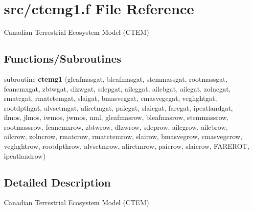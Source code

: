\hypertarget{ctemg1_8f}{}\section{src/ctemg1.f File Reference}
\label{ctemg1_8f}


Canadian Terrestrial Ecosystem Model (C\+T\+E\+M)  


\subsection*{Functions/\+Subroutines}
\begin{DoxyCompactItemize}
\item 
\hypertarget{ctemg1_8f_ad173c7eefb7f79fe8473bb162aa2f2e3}{}subroutine {\bfseries ctemg1} (gleafmasgat, bleafmasgat, stemmassgat, rootmassgat, fcancmxgat, zbtwgat, dlzwgat, sdepgat, ailcggat, ailcbgat, ailcgat, zolncgat, rmatcgat, rmatctemgat, slaigat, bmasveggat, cmasvegcgat, veghghtgat, rootdpthgat, alvsctmgat, alirctmgat, paicgat, slaicgat, faregat, ipeatlandgat, ilmos, jlmos, iwmos, jwmos, nml, gleafmasrow, bleafmasrow, stemmassrow, rootmassrow, fcancmxrow, zbtwrow, dlzwrow, sdeprow, ailcgrow, ailcbrow, ailcrow, zolncrow, rmatcrow, rmatctemrow, slairow, bmasvegrow, cmasvegcrow, veghghtrow, rootdpthrow, alvsctmrow, alirctmrow, paicrow, slaicrow, F\+A\+R\+E\+R\+O\+T, ipeatlandrow)\label{ctemg1_8f_ad173c7eefb7f79fe8473bb162aa2f2e3}

\end{DoxyCompactItemize}


\subsection{Detailed Description}
Canadian Terrestrial Ecosystem Model (C\+T\+E\+M) 

